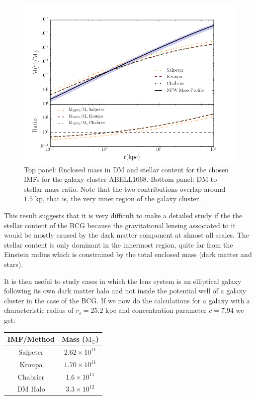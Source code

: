 \begin{figure}[H]
\centering
\includegraphics[width=12cm]{images/DM_fraction_all_IMFs.png}
\caption[Enclosed mass and DM to stellar mass ratio for a galaxy cluster]{Top panel: Enclosed mass in DM and stellar content for the chosen IMFs for the galaxy cluster ABELL1068. Bottom panel: DM to stellar mass ratio. Note that the two contributions overlap around $1.5 $ kp, that is, the very inner region of the galaxy cluster.}
\end{figure}

This result suggests that it is very difficult to make a detailed study if the the stellar content of the BCG because the gravitational lensing associated to it would be mostly caused by the dark matter component at almost all scales. The stellar content is only dominant in the innermost region, quite far from the Einstein radius which is constrained by the total enclosed mass (dark matter and stars).

It is then useful to study cases in which the lens system is an elliptical galaxy following its own dark matter halo and not inside the potential well of a galaxy cluster in the case of the BCG. If we now do the calculations for a galaxy with a characteristic radius of $r_s=25.2$ kpc and concentration parameter $c=7.94$ we get:

\begin{center}
\begin{tabular}{c c}
IMF/Method & Mass ($\text{M}_{\odot}$)\tabularnewline
\hline 
\hline
Salpeter & $2.62\times10^{11}$\tabularnewline
Kroupa & $1.70\times10^{11}$\tabularnewline
Chabrier & $1.6\times10^{11}$\tabularnewline
DM Halo & $3.3\times10^{12}$\tabularnewline
\end{tabular}
\end{center}

